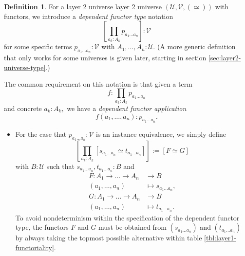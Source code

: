 \documentclass[a4paper]{article}
\theoremstyle{definition}
\newtheorem{definition}{Definition}[section]
\theoremstyle{remark}
\newcommand{\defn}{\emph}
\renewcommand{\equiv}{\simeq}
\newcommand{\U}{\mathcal{U}}
\newcommand{\V}{\mathcal{V}}
\begin{document}
\begin{definition}
  \label{def:layer2-dependent-functor-type}
  For a layer 2 universe layer 2 universe $(\U,\V,(\equiv))$ with functors, we introduce a
  \defn{dependent functor type} notation
  \[\left[\prod_{a_k : A_k} p_{a_1 \dots a_n}\right] : \V\]
  for some specific terms $p_{a_1 \dots a_n} : \V$ with $A_1,\dots,A_n : \U.$
  (A more generic definition that only works for some universes is given later, starting in section
  \ref{sec:layer2-universe-type}.)

  The common requirement on this notation is that given a term
  \[f : \prod_{a_k : A_k} p_{a_1 \dots a_n}\]
  and concrete $a_k : A_k,$ we have a \defn{dependent functor application}
  \[f(a_1,\dots,a_n) : p_{a_1 \dots a_n}.\]

  \begin{itemize}
    \item For the case that $p_{a_1 \dots a_n} : \V$ is an instance equivalence, we simply define
    \[\left[\prod_{a_k : A_k} [s_{a_1 \dots a_n} \equiv t_{a_1 \dots a_n}]\right] := [F \equiv G]\]
    with $B : \U$ such that $s_{a_1 \dots a_n},t_{a_1 \dots a_n} : B$ and
    \begin{align*}
      F : A_1 \to \dots \to A_n &\to     B\\
          (a_1,\dots,a_n)       &\mapsto s_{a_1 \dots a_n},\\[1ex]
      G : A_1 \to \dots \to A_n &\to     B\\
          (a_1,\dots,a_n)       &\mapsto t_{a_1 \dots a_n}.
    \end{align*}
    To avoid nondeterminism within the specification of the dependent functor type, the functors $F$
    and $G$ must be obtained from $(s_{a_1 \dots a_n})$ and $(t_{a_1 \dots a_n})$ by always taking
    the topmost possible alternative within table \ref{tbl:layer1-functoriality}.


\end{itemize}
\end{definition}
\end{document}
